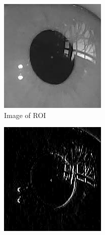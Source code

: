     \begin{figure}[ht]
      \centering
      \begin{subfigure}{.33\textwidth}
        \centering
        \includegraphics[width=.9\linewidth]{plots/eye_dataset/roi.png}
        \caption{Image of ROI}
        \label{fig:roig}
      \end{subfigure}%
      \begin{subfigure}{.33\textwidth}
        \centering
        \includegraphics[width=.9\linewidth]{plots/eye_dataset/sx.png}

\end{subfigure}
\end{figure}
